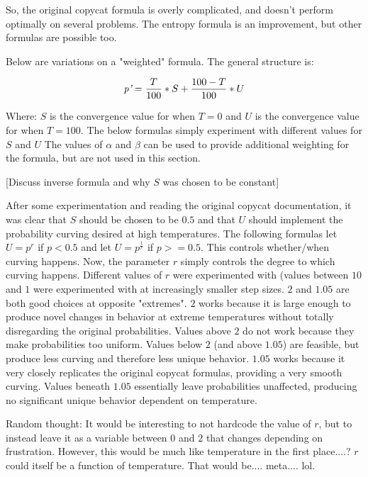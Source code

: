 \documentclass[a4paper]{article}
\begin{document}
So, the original copycat formula is overly complicated, and doesn't perform optimally on several problems.
The entropy formula is an improvement, but other formulas are possible too.

Below are variations on a "weighted" formula.
The general structure is:

\[\emph{p'} = \frac{T}{100} * S + \frac{100-T}{100} * U\]

Where: $S$ is the convergence value for when $T = 0$ and
       $U$ is the convergence value for when $T = 100$.
The below formulas simply experiment with different values for $S$ and $U$
The values of $\alpha$ and $\beta$ can be used to provide additional weighting for the formula, but are not used in this section.



[Discuss inverse formula and why $S$ was chosen to be constant]

After some experimentation and reading the original copycat documentation, it was clear that $S$ should be chosen to be $0.5$ and that $U$ should implement the probability curving desired at high temperatures. 
The following formulas let $U = p^r$ if $p < 0.5$ and let $U = p^\frac{1}{r}$ if $p >= 0.5$.
This controls whether/when curving happens.
Now, the parameter $r$ simply controls the degree to which curving happens.
Different values of $r$ were experimented with (values between $10$ and $1$ were experimented with at increasingly smaller step sizes. 
$2$ and $1.05$ are both good choices at  opposite "extremes".
$2$ works because it is large enough to produce novel changes in behavior at extreme temperatures without totally disregarding the original probabilities.
Values above $2$ do not work because they make probabilities too uniform.
Values below $2$ (and above $1.05$) are feasible, but produce less curving and therefore less unique behavior.
$1.05$ works because it very closely replicates the original copycat formulas, providing a very smooth curving.
Values beneath $1.05$ essentially leave probabilities unaffected, producing no significant unique behavior dependent on temperature.



Random thought:
It would be interesting to not hardcode the value of $r$, but to instead leave it as a variable between $0$ and $2$ that changes depending on frustration.
However, this would be much like temperature in the first place....?
$r$ could itself be a function of temperature. That would be.... meta.... lol.
\end{document}
